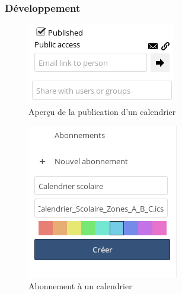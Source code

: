 \documentclass[12pt]{beamer}
\begin{document}
	\begin{frame}
		\frametitle{Développement}
		\begin{minipage}{0.45\textwidth}
			\begin{flushleft}
				\begin{figure}
					\centering
					\includegraphics[width=1\linewidth]{images/emailpublic.png}
					\caption{Aperçu de la publication d'un calendrier}
					\label{fig:publication-img}
				\end{figure}
			\end{flushleft}
		\end{minipage}
		\begin{minipage}{0.45\textwidth}
			\begin{flushright}
				\begin{figure}
					\centering
					\includegraphics[width=1\linewidth]{images/creation_abonnement.png}
					\caption{Abonnement à un calendrier}
					\label{fig:ajout-abdonnement}
				\end{figure}
			\end{flushright}
		\end{minipage}
	\end{frame}
\end{document}
